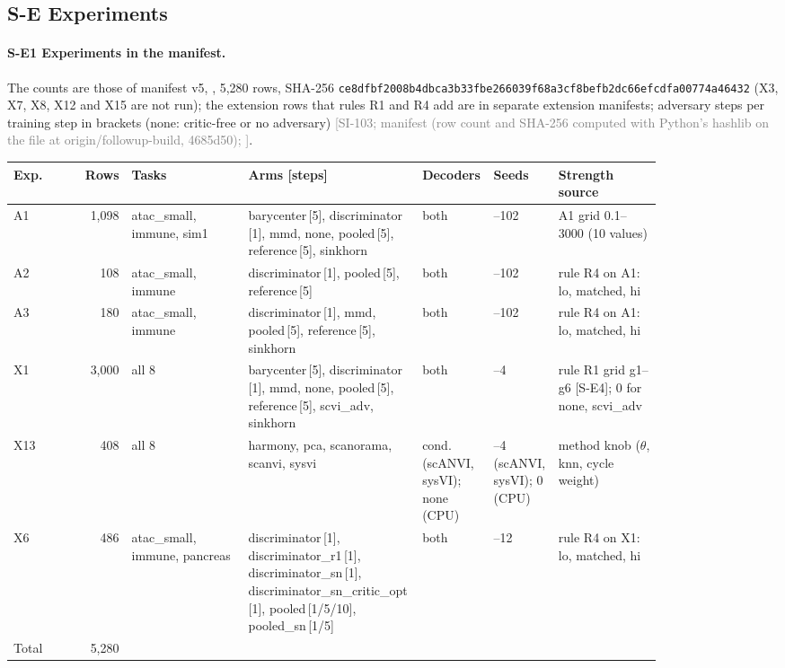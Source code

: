 \documentclass[11pt]{article}
\newcommand{\src}[1]{{\scriptsize\textcolor{gray}{[#1]}}}
\begin{document}
\subsection*{S-E Experiments}
\paragraph{S-E1 Experiments in the manifest.} The counts are those of manifest v5, , 5,280 rows, SHA-256 \texttt{ce8dfbf2008b4dbca3b33fbe266039f6\allowbreak{}8a3cf8befb2dc66efcdfa00774a46432} (X3, X7, X8, X12 and X15 are not run); the extension rows that rules R1 and R4 add are in separate extension manifests; adversary steps per training step in brackets (none: critic-free or no adversary) \src{SI-103; manifest (row count and SHA-256 computed with Python's hashlib on the file at origin/followup-build, 4685d50); \file{docs/manifest_v5_counts.csv}}.
{\footnotesize\setlength{\tabcolsep}{3pt}
\begin{longtable}{>{\raggedright\arraybackslash}p{0.05\linewidth}r>{\raggedright\arraybackslash}p{0.18\linewidth}>{\raggedright\arraybackslash}p{0.24\linewidth}>{\raggedright\arraybackslash}p{0.11\linewidth}>{\raggedright\arraybackslash}p{0.1\linewidth}>{\raggedright\arraybackslash}p{0.16\linewidth}}
\toprule
Exp. & Rows & Tasks & Arms [steps] & Decoders & Seeds & Strength source \\
\midrule
\endhead
A1 & 1,098 & atac\_small, immune, sim1 & barycenter\,[5], discriminator\,[1], mmd, none, pooled\,[5], reference\,[5], sinkhorn & both & 100--102 & A1 grid 0.1--3000 (10 values) \\
A2 & 108 & atac\_small, immune & discriminator\,[1], pooled\,[5], reference\,[5] & both & 100--102 & rule R4 on A1: lo, matched, hi \\
A3 & 180 & atac\_small, immune & discriminator\,[1], mmd, pooled\,[5], reference\,[5], sinkhorn & both & 100--102 & rule R4 on A1: lo, matched, hi \\
X1 & 3,000 & all 8 & barycenter\,[5], discriminator\,[1], mmd, none, pooled\,[5], reference\,[5], scvi\_adv, sinkhorn & both & 0--4 & rule R1 grid g1--g6 [S-E4]; 0 for none, scvi\_adv \\
X13 & 408 & all 8 & harmony, pca, scanorama, scanvi, sysvi & cond. (scANVI, sysVI); none (CPU) & 0--4 (scANVI, sysVI); 0 (CPU) & method knob ($\theta$, knn, cycle weight) \\
X6 & 486 & atac\_small, immune, pancreas & discriminator\,[1], discriminator\_r1\,[1], discriminator\_sn\,[1], discriminator\_sn\_critic\_opt\,[1], pooled\,[1/5/10], pooled\_sn\,[1/5] & both & 10--12 & rule R4 on X1: lo, matched, hi \\
Total & 5,280 & & & & & \\
\bottomrule
\end{longtable}
}
\end{document}
